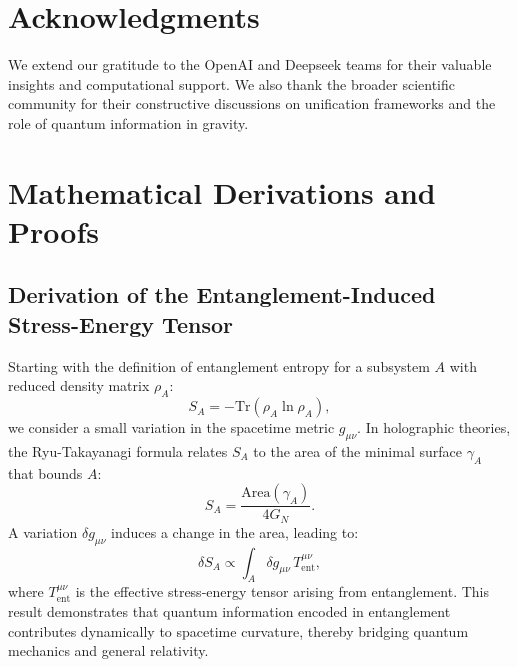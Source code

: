 \documentclass[12pt, a4paper]{article}
\begin{document}
\section*{Acknowledgments}
We extend our gratitude to the OpenAI and Deepseek teams for their valuable insights and computational support. We also thank the broader scientific community for their constructive discussions on unification frameworks and the role of quantum information in gravity.

\section{Mathematical Derivations and Proofs}

\subsection{Derivation of the Entanglement-Induced Stress-Energy Tensor}
Starting with the definition of entanglement entropy for a subsystem \(A\) with reduced density matrix \(\rho_A\):
\begin{equation}
    S_A = -\text{Tr}(\rho_A \ln \rho_A),
\end{equation}
we consider a small variation in the spacetime metric \(g_{\mu\nu}\). In holographic theories, the Ryu-Takayanagi formula relates \(S_A\) to the area of the minimal surface \(\gamma_A\) that bounds \(A\):
\begin{equation}
    S_A = \frac{\text{Area}(\gamma_A)}{4G_N}.
\end{equation}
A variation \(\delta g_{\mu\nu}\) induces a change in the area, leading to:
\begin{equation}
    \delta S_A \propto \int_A \delta g_{\mu\nu}\, T^{\mu\nu}_{\text{ent}},
\end{equation}
where \(T^{\mu\nu}_{\text{ent}}\) is the effective stress-energy tensor arising from entanglement. This result demonstrates that quantum information encoded in entanglement contributes dynamically to spacetime curvature, thereby bridging quantum mechanics and general relativity.
\end{document}
